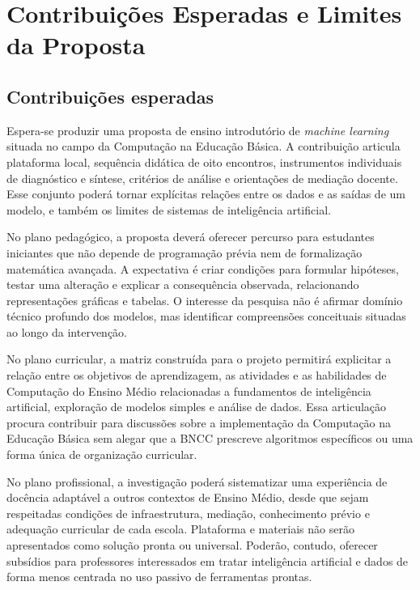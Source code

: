 \chapter{Contribuições Esperadas e Limites da Proposta}

\section{Contribuições esperadas}

Espera-se produzir uma proposta de ensino introdutório de \textit{machine learning} situada no campo da Computação na Educação Básica. A contribuição articula plataforma local, sequência didática de oito encontros, instrumentos individuais de diagnóstico e síntese, critérios de análise e orientações de mediação docente. Esse conjunto poderá tornar explícitas relações entre os dados e as saídas de um modelo, e também os limites de sistemas de inteligência artificial.

No plano pedagógico, a proposta deverá oferecer percurso para estudantes iniciantes que não depende de programação prévia nem de formalização matemática avançada. A expectativa é criar condições para formular hipóteses, testar uma alteração e explicar a consequência observada, relacionando representações gráficas e tabelas. O interesse da pesquisa não é afirmar domínio técnico profundo dos modelos, mas identificar compreensões conceituais situadas ao longo da intervenção.

No plano curricular, a matriz construída para o projeto permitirá explicitar a relação entre os objetivos de aprendizagem, as atividades e as habilidades de Computação do Ensino Médio relacionadas a fundamentos de inteligência artificial, exploração de modelos simples e análise de dados. Essa articulação procura contribuir para discussões sobre a implementação da Computação na Educação Básica sem alegar que a BNCC prescreve algoritmos específicos ou uma forma única de organização curricular.

No plano profissional, a investigação poderá sistematizar uma experiência de docência adaptável a outros contextos de Ensino Médio, desde que sejam respeitadas condições de infraestrutura, mediação, conhecimento prévio e adequação curricular de cada escola. Plataforma e materiais não serão apresentados como solução pronta ou universal. Poderão, contudo, oferecer subsídios para professores interessados em tratar inteligência artificial e dados de forma menos centrada no uso passivo de ferramentas prontas.

